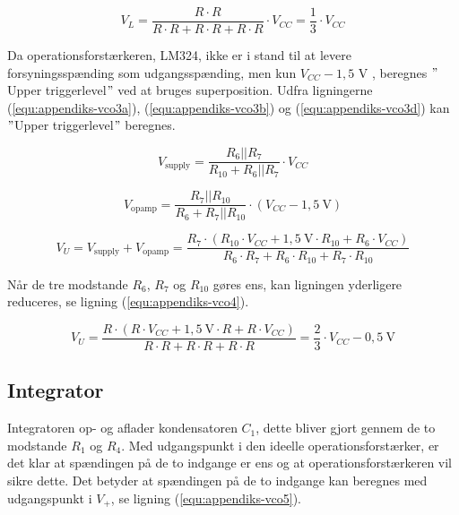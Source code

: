 \begin{equation}
\label{equ:appendiks-vco2}
V_L = \frac{R \cdot R}{R \cdot R + R \cdot R + R \cdot R} \cdot V_{CC} = \frac{1}{3} \cdot V_{CC}
\end{equation}

Da operationsforstærkeren, LM324, ikke er i stand til at levere forsyningsspænding som udgangsspænding, men kun $V_{CC} - 1,5$ V \cite{lm324-datablad}, beregnes $"$Upper triggerlevel$"$ ved at bruges superposition. Udfra ligningerne (\ref{equ:appendiks-vco3a}), (\ref{equ:appendiks-vco3b}) og (\ref{equ:appendiks-vco3d}) kan $"$Upper triggerlevel$"$ beregnes.

\begin{equation}
\label{equ:appendiks-vco3a}
V_{\mathrm{supply}} = \frac{R_6||R_7}{R_{10} + R_6||R_7} \cdot V_{CC}
\end{equation}

\begin{equation}
\label{equ:appendiks-vco3b}
V_{\mathrm{opamp}} = \frac{R_7||R_{10}}{R_6 + R_7||R_{10}} \cdot (V_{CC} - 1,5~\mathrm{V})
\end{equation}

\begin{equation}
\label{equ:appendiks-vco3d}
V_U = V_{\mathrm{supply}} + V_{\mathrm{opamp}} = \frac{R_7 \cdot (R_{10} \cdot V_{CC} + 1,5~\mathrm{V} \cdot R_{10} + R_6 \cdot V_{CC})}{R_6 \cdot R_7 + R_6 \cdot R_{10} + R_7 \cdot R_{10}}
\end{equation}

Når de tre modstande $R_6$, $R_7$ og $R_{10}$ gøres ens, kan ligningen yderligere reduceres, se ligning (\ref{equ:appendiks-vco4}).

\begin{equation}
\label{equ:appendiks-vco4}
V_U = \frac{R \cdot (R \cdot V_{CC} + 1,5~\mathrm{V} \cdot R + R \cdot V_{CC})}{R \cdot R + R \cdot R + R \cdot R} = \frac{2}{3} \cdot V_{CC} - 0,5~\mathrm{V}
\end{equation}

\subsection*{Integrator}
Integratoren op- og aflader kondensatoren $C_1$, dette bliver gjort gennem de to modstande $R_1$ og $R_4$. Med udgangspunkt i den ideelle operationsforstærker, er det klar at spændingen på de to indgange er ens og at operationsforstærkeren vil sikre dette. Det betyder at spændingen på de to indgange kan beregnes med udgangspunkt i $V_+$, se ligning (\ref{equ:appendiks-vco5}).

